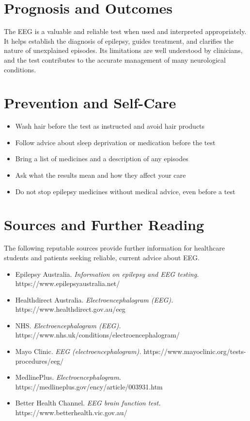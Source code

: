 \section*{Prognosis and Outcomes}
The EEG is a valuable and reliable test when used and interpreted appropriately. It helps establish the diagnosis of epilepsy, guides treatment, and clarifies the nature of unexplained episodes. Its limitations are well understood by clinicians, and the test contributes to the accurate management of many neurological conditions.

\section*{Prevention and Self-Care}
\begin{itemize}
    \item Wash hair before the test as instructed and avoid hair products
    \item Follow advice about sleep deprivation or medication before the test
    \item Bring a list of medicines and a description of any episodes
    \item Ask what the results mean and how they affect your care
    \item Do not stop epilepsy medicines without medical advice, even before a test
\end{itemize}

\section*{Sources and Further Reading}
The following reputable sources provide further information for healthcare students and patients seeking reliable, current advice about EEG.
\begin{itemize}
    \item Epilepsy Australia. \textit{Information on epilepsy and EEG testing.} https://www.epilepsyaustralia.net/
    \item Healthdirect Australia. \textit{Electroencephalogram (EEG).} https://www.healthdirect.gov.au/eeg
    \item NHS. \textit{Electroencephalogram (EEG).} https://www.nhs.uk/conditions/electroencephalogram/
    \item Mayo Clinic. \textit{EEG (electroencephalogram).} https://www.mayoclinic.org/tests-procedures/eeg/
    \item MedlinePlus. \textit{Electroencephalogram.} https://medlineplus.gov/ency/article/003931.htm
    \item Better Health Channel. \textit{EEG brain function test.} https://www.betterhealth.vic.gov.au/
\end{itemize}
